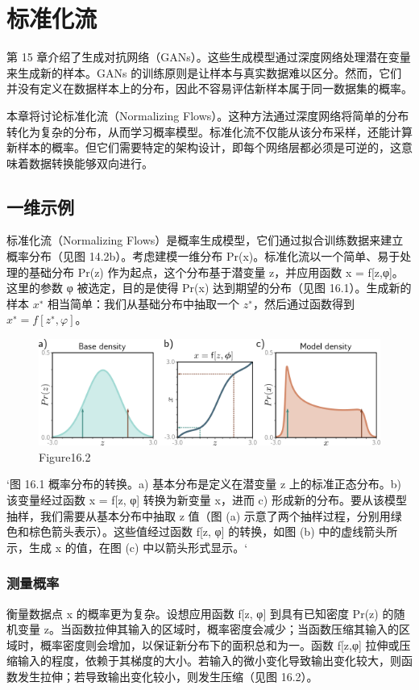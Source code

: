 \chapter{标准化流}

第 15 章介绍了生成对抗网络（GANs）。这些生成模型通过深度网络处理潜在变量来生成新的样本。GANs 的训练原则是让样本与真实数据难以区分。然而，它们并没有定义在数据样本上的分布，因此不容易评估新样本属于同一数据集的概率。

本章将讨论标准化流（Normalizing Flows）。这种方法通过深度网络将简单的分布转化为复杂的分布，从而学习概率模型。标准化流不仅能从该分布采样，还能计算新样本的概率。但它们需要特定的架构设计，即每个网络层都必须是可逆的，这意味着数据转换能够双向进行。

\section{一维示例}
标准化流（Normalizing Flows）是概率生成模型，它们通过拟合训练数据来建立概率分布（见图 14.2b）。考虑建模一维分布 Pr(x)。标准化流以一个简单、易于处理的基础分布 Pr(z) 作为起点，这个分布基于潜变量 z，并应用函数 x = f[z,φ]。这里的参数 φ 被选定，目的是使得 Pr(x) 达到期望的分布（见图 16.1）。生成新的样本 \(x^∗\) 相当简单：我们从基础分布中抽取一个 \(z^∗\)，然后通过函数得到 \(x^∗ = f[z^∗, φ]\)。

\begin{figure}[h!]
\centering
\includegraphics[width=0.7\linewidth]{png/chapter16/FlowIntro.png}
\caption{Figure16.2}
\end{figure}

`图 16.1 概率分布的转换。a) 基本分布是定义在潜变量 z 上的标准正态分布。b) 该变量经过函数 x = f[z, φ] 转换为新变量 x，进而 c) 形成新的分布。要从该模型抽样，我们需要从基本分布中抽取 z 值（图 (a) 示意了两个抽样过程，分别用绿色和棕色箭头表示）。这些值经过函数 f[z, φ] 的转换，如图 (b) 中的虚线箭头所示，生成 x 的值，在图 (c) 中以箭头形式显示。`
\subsection{测量概率}
衡量数据点 x 的概率更为复杂。设想应用函数 f[z, φ] 到具有已知密度 Pr(z) 的随机变量 z。当函数拉伸其输入的区域时，概率密度会减少；当函数压缩其输入的区域时，概率密度则会增加，以保证新分布下的面积总和为一。函数 f[z,φ] 拉伸或压缩输入的程度，依赖于其梯度的大小。若输入的微小变化导致输出变化较大，则函数发生拉伸；若导致输出变化较小，则发生压缩（见图 16.2）。

